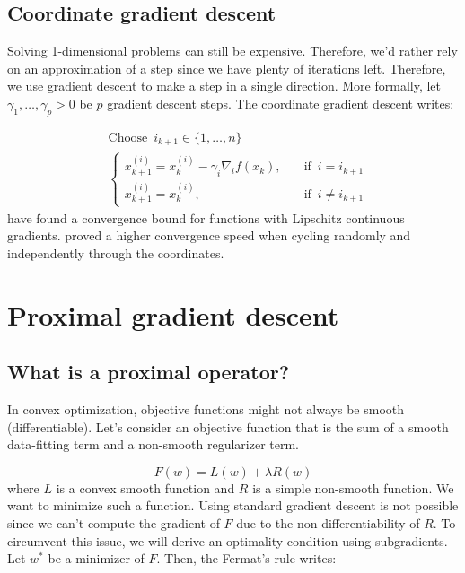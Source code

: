 \documentclass[a4paper,10pt]{article}
\theoremstyle{definition}
\begin{document}
\subsection*{Coordinate gradient descent}

Solving 1-dimensional problems can still be expensive. Therefore, we'd rather rely on an approximation of
a step since we have plenty of iterations left. Therefore, we use gradient descent to make a step in a single
direction. More formally, let $\gamma_1, \dots, \gamma_p > 0$ be $p$ gradient descent steps. The coordinate
gradient descent writes:

\begin{align*}
     & \text{Choose} \enspace i_{k+1} \in \{1, \dots, n\} \\
     & \begin{cases}
        x_{k+1}^{(i)} = x_{k}^{(i)} - \gamma_i \nabla_i f(x_k), \quad & \text{if} \enspace i = i_{k+1}    \\
        x_{k+1}^{(i)} = x_{k}^{(i)}, \quad                            & \text{if} \enspace i \neq i_{k+1}
    \end{cases}
\end{align*}
%
\cite{Beck_Tetruashvili13} have found a convergence bound for functions with Lipschitz continuous
gradients. \cite{Nesterov12} proved a higher convergence speed when cycling randomly and independently
through the coordinates.

\section*{Proximal gradient descent}

\subsection*{What is a proximal operator?}

In convex optimization, objective functions might not always be smooth (differentiable). Let's consider
an objective function that is the sum of a smooth data-fitting term and a non-smooth regularizer term.

\begin{equation*}
    F(w) = L(w) + \lambda R(w)
\end{equation*}
%
where $L$ is a convex smooth function and $R$ is a simple non-smooth function. We want to
minimize such a function. Using standard gradient descent is not possible since we can't compute the
gradient of $F$ due to the non-differentiability of $R$. To circumvent this issue, we will derive an
optimality condition using subgradients. Let $w^*$ be a minimizer of $F$. Then, the Fermat's rule
writes:
\end{document}
